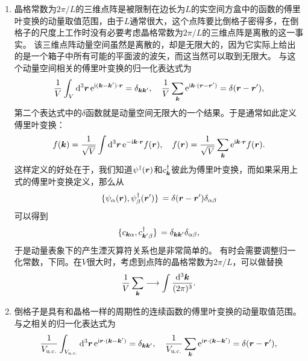 \documentclass[hyperref, UTF8, a4paper]{ctexart}
\newcommand*{\ii}{\mathrm{i}}
\newcommand*{\ee}{\mathrm{e}}
\begin{document}
\begin{enumerate}
    \item 晶格常数为$2\pi / L$的三维点阵是被限制在边长为$L$的实空间方盒中的函数的傅里叶变换的动量取值范围，由于$L$通常很大，这个点阵要比倒格子密得多，在倒格子的尺度上工作时没有必要考虑晶格常数为$2\pi / L$的三维点阵是离散的这一事实。
    该三维点阵动量空间虽然是离散的，却是无限大的，因为它实际上给出的是一个箱子中所有可能的平面波的波矢，而这当然可以取到无限大。
    与这个动量空间相关的傅里叶变换的归一化表达式为
    \begin{equation}
        \frac{1}{V} \int_V \dd[3]{\vb*{r}} \ee^{\ii (\vb*{k} - \vb*{k}') \cdot \vb*{r}} = \delta_{\vb*{k} \vb*{k}'}, \quad \frac{1}{V} \sum_{\vb*{k}} \ee^{\ii \vb*{k} \cdot (\vb*{r} - \vb*{r}')} = \delta(\vb*{r} - \vb*{r}'),
    \end{equation}
    第二个表达式中的$\delta$函数就是动量空间无限大的一个结果。于是通常如此定义傅里叶变换：
    \begin{equation}
        f(\vb*{k}) = \frac{1}{\sqrt{V}} \int \dd[3]{\vb*{r}} \ee^{- \ii \vb*{k} \cdot \vb*{r}} f(\vb*{r}), \quad f(\vb*{r}) = \frac{1}{\sqrt{V}} \sum_{\vb*{k}} \ee^{\ii \vb*{k} \cdot \vb*{r}} f(\vb*{r}).
    \end{equation}
    这样定义的好处在于，我们知道${\psi}^\dagger(\vb*{r})$和${c}^\dagger_{\vb*{k}}$彼此为傅里叶变换，而如果采用上式的傅里叶变换定义，那么从
    \[
        \acomm*{{\psi}_\alpha(\vb*{r})}{{\psi}^\dagger_\beta(\vb*{r}')} = \delta(\vb*{r}-\vb*{r}') \delta_{\alpha \beta}
    \]
    可以得到
    \[
        \acomm*{{c}_{\vb*{k}\alpha}}{{c}^\dagger_{\vb*{k}' \beta}} = \delta_{\vb*{k} \vb*{k}'} \delta_{\alpha \beta},
    \]
    于是动量表象下的产生湮灭算符关系也是非常简单的。
    有时会需要调整归一化常数，下同。在$V$很大时，考虑到点阵的晶格常数为$2\pi / L$，可以做替换
    \begin{equation}
        \frac{1}{V} \sum_{\vb*{k}} \longrightarrow \int \frac{\dd[3]{\vb*{k}}}{(2\pi)^3}.
    \end{equation}
    \item 倒格子是具有和晶格一样的周期性的连续函数的傅里叶变换的动量取值范围。与之相关的归一化表达式为
    \begin{equation}
        \frac{1}{V_\text{u.c.}} \int_{V_\text{u.c.}} \dd[3]{\vb*{r}} \ee^{\ii \vb*{r} \cdot (\vb*{k} - \vb*{k}')} = \delta_{\vb*{k} \vb*{k}'}, \quad \frac{1}{V_\text{u.c.}} \sum_{\vb*{k}} \ee^{\ii \vb*{r} \cdot (\vb*{k} - \vb*{k}')} = \delta(\vb*{r} - \vb*{r}'), 
        \label{eq:normalization-periodic}
    \end{equation}

\end{enumerate}
\end{document}
